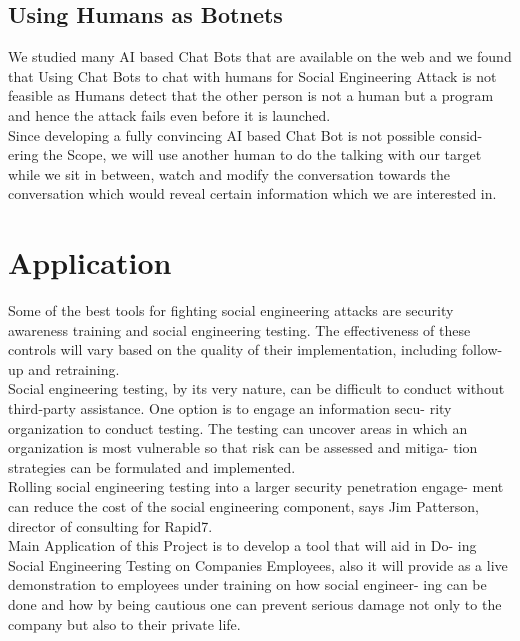 \subsection{Using Humans as Botnets}

We studied many AI based Chat Bots that are available on the web and
we found that Using Chat Bots to chat with humans for Social Engineering Attack is not feasible as Humans detect that the other person is not a
human but a program and hence the attack fails even before it is launched.\cite{paper_towardsautomating}\\[0.5cm]
Since developing a fully convincing AI based Chat Bot is not possible consid-
ering the Scope, we will use another human to do the talking with our target
while we sit in between, watch and modify the conversation towards the
conversation which would reveal certain information which we are interested
in.\cite{paper_honeybot}


\section{Application}
Some of the best tools for fighting social engineering attacks are security
awareness training and social engineering testing. The effectiveness of these
controls will vary based on the quality of their implementation, including
follow-up and retraining.\\[0.5cm]
Social engineering testing, by its very nature, can be difficult to conduct
without third-party assistance. One option is to engage an information secu-
rity organization to conduct testing. The testing can uncover areas in which
an organization is most vulnerable so that risk can be assessed and mitiga-
tion strategies can be formulated and implemented.\\[0.5cm]
Rolling social engineering testing into a larger security penetration engage-
ment can reduce the cost of the social engineering component, says Jim
Patterson, director of consulting for Rapid7.\cite{link_humanweak}\\[0.5cm]
Main Application of this Project is to develop a tool that will aid in Do-
ing Social Engineering Testing on Companies Employees, also it will provide
as a live demonstration to employees under training on how social engineer-
ing can be done and how by being cautious one can prevent serious damage
not only to the company but also to their private life.\\[0.5cm]
